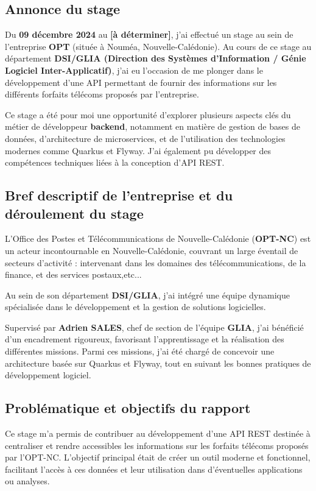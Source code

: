 \documentclass{article}
\begin{document}
	\subsection{Annonce du stage}
	
	Du \textbf{09 décembre 2024} au \textbf{[à déterminer]}, j’ai effectué un stage au sein de l’entreprise \textbf{OPT} (située à Nouméa, Nouvelle-Calédonie). Au cours de ce stage au département \textbf{DSI/GLIA (Direction des Systèmes d'Information / Génie Logiciel Inter-Applicatif)}, j’ai eu l’occasion de me plonger dans le développement d’une API permettant de fournir des informations sur les différents forfaits télécoms proposés par l’entreprise.
	
	Ce stage a été pour moi une opportunité d’explorer plusieurs aspects clés du métier de développeur \textbf{backend}, notamment en matière de gestion de bases de données, d’architecture de microservices, et de l’utilisation des technologies modernes comme Quarkus et Flyway. J’ai également pu développer des compétences techniques liées à la conception d’API REST.
	
	\subsection{Bref descriptif de l’entreprise et du déroulement du stage}
	
	L’Office des Postes et Télécommunications de Nouvelle-Calédonie (\textbf{OPT-NC}) est un acteur incontournable en Nouvelle-Calédonie, couvrant un large éventail de secteurs d'activité : intervenant dans les domaines des télécommunications, de la finance, et des services postaux,etc...
	
	Au sein de son département \textbf{DSI/GLIA}, j’ai intégré une équipe dynamique spécialisée dans le développement et la gestion de solutions logicielles.
	
	
	Supervisé par \textbf{Adrien SALES}, chef de section de l’équipe \textbf{GLIA}, j’ai bénéficié d’un encadrement rigoureux, favorisant l’apprentissage et la réalisation des différentes missions. Parmi ces missions, j’ai été chargé de concevoir une architecture basée sur Quarkus et Flyway, tout en suivant les bonnes pratiques de développement logiciel.
	
	\subsection{Problématique et objectifs du rapport}
	
	Ce stage m’a permis de contribuer au développement d’une API REST destinée à centraliser et rendre accessibles les informations sur les forfaits télécoms proposés par l’OPT-NC. L’objectif principal était de créer un outil moderne et fonctionnel, facilitant l’accès à ces données et leur utilisation dans d’éventuelles applications ou analyses.
	
\end{document}
